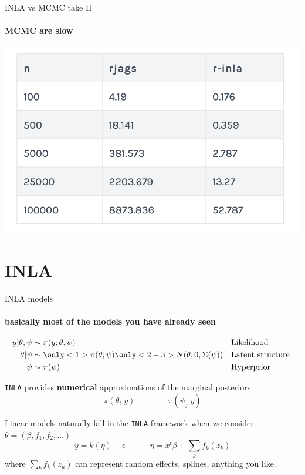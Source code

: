 \documentclass[9pt,ignorenonframetext,]{beamer}
\begin{document}
\begin{frame}{INLA vs MCMC take II}
\protect\hypertarget{inla-vs-mcmc-take-ii}{}

\framesubtitle{MCMC are slow}

\includegraphics[width=.9\textwidth]{run.png}

\end{frame}

\hypertarget{inla-1}{%
\section{INLA}\label{inla-1}}

\begin{frame}[fragile]{INLA models}
\protect\hypertarget{inla-models}{}

\framesubtitle{basically most of the models you have already seen}

\begin{align*}
    y|\theta, \psi &\sim  \pi(y; \theta, \psi) & & \text{Likelihood}\\
    \theta | \psi &\sim  \only<1>{\pi(\theta;\psi)}\only<2-3>{N(\theta; 0, \Sigma(\psi) )} & & \text{Latent structure }\\
    \psi &\sim \pi(\psi) & & \text{Hyperprior}\\
\end{align*}

\texttt{INLA} provides \textbf{numerical} approximations of the marginal
posteriors \[\pi(\theta_i| y) \qquad \qquad    \pi(\psi_j | y)\]

\pause
\pause

Linear models naturally fall in the \texttt{INLA} framework when we
consider \(\theta = (\beta, f_1, f_2, \dots)\)
\[y= k(\eta) + \epsilon  \qquad \quad \eta = x^t\beta + \sum_k f_k(z_k)\]
where \(\sum_k f_k(z_k)\) can represent random effects, splines,
anything you like.

\end{frame}
\end{document}
